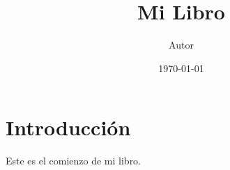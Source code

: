 \documentclass{memoir}
\begin{document}
	\frontmatter
	\title{Mi Libro}
	\author{Autor}
	\date{\today}
	\maketitle
	\tableofcontents
	\mainmatter
	\chapter{Introducción}
	Este es el comienzo de mi libro.
\end{document}
